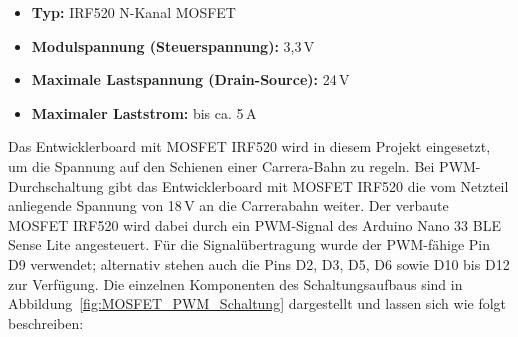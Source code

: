 \bigskip

\begin{itemize}
	\item \textbf{Typ:} IRF520 N-Kanal MOSFET
	\item \textbf{Modulspannung (Steuerspannung):} 3{,}3\,V 
	\item \textbf{Maximale Lastspannung (Drain-Source):} 24\,V
	\item \textbf{Maximaler Laststrom:} bis ca. 5\,A
\end{itemize}
 \newpage

Das Entwicklerboard mit MOSFET IRF520 wird in diesem Projekt eingesetzt, um die Spannung auf den Schienen einer Carrera-Bahn zu regeln.\cite{OpenPlatform.cc.2020} Bei PWM-Durchschaltung gibt das Entwicklerboard mit MOSFET IRF520 die vom Netzteil anliegende Spannung von 18\,V an die Carrerabahn weiter. Der verbaute MOSFET IRF520 wird dabei durch ein PWM-Signal des Arduino Nano 33 BLE Sense Lite angesteuert. Für die Signalübertragung wurde der PWM-fähige Pin D9 verwendet; alternativ stehen auch die Pins D2, D3, D5, D6 sowie D10 bis D12 zur Verfügung.\cite{Arduino.2025b}
Die einzelnen Komponenten des Schaltungsaufbaus sind in Abbildung~\ref{fig:MOSFET_PWM_Schaltung} dargestellt und lassen sich wie folgt beschreiben:

